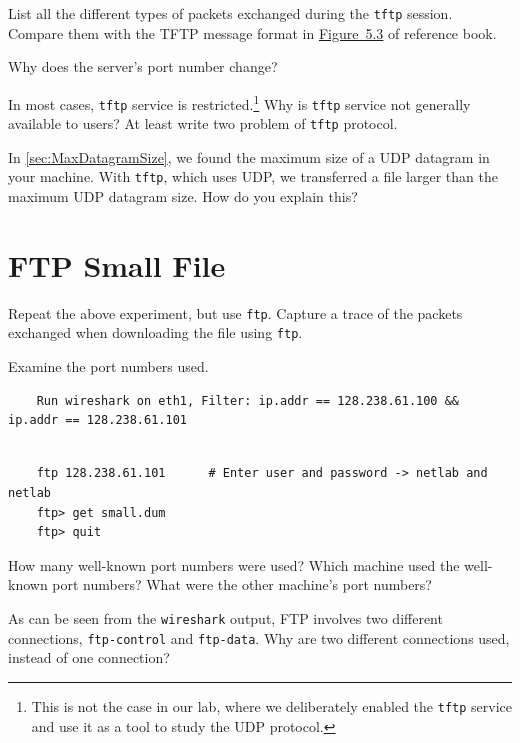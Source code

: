 \documentclass{UTNetLab}
\begin{document}
    \begin{report}
        \item List all the different types of packets exchanged during the \lstinline{tftp} session. Compare them with the TFTP message format in \hyperref[fig:5.3]{Figure~5.3} of reference book.

        Why does the server’s port number change?
        
        \item In most cases, \lstinline{tftp} service is restricted.\footnote{This is not the case in our lab, where we deliberately enabled the \lstinline{tftp} service and use it as a tool to study the UDP protocol.}
        Why is \lstinline{tftp} service not generally available to users? At least write two problem of \lstinline{tftp} protocol.
        
        \item In \autoref{sec:MaxDatagramSize}, we found the maximum size of a UDP datagram in your machine. With \lstinline{tftp}, which uses UDP, we transferred a file larger than the maximum UDP datagram size.
        How do you explain this?
    \end{report}

\section{FTP Small File}
    Repeat the above experiment, but use \lstinline{ftp}.
    Capture a trace of the packets exchanged when downloading the  file using \lstinline{ftp}.

    Examine the port numbers used.
    
    \begin{lstlisting}
    Run wireshark on eth1, Filter: ip.addr == 128.238.61.100 && ip.addr == 128.238.61.101
      
    \end{lstlisting}
    
    \begin{lstlisting}
    ftp 128.238.61.101		# Enter user and password -> netlab and netlab
    ftp> get small.dum
    ftp> quit
    \end{lstlisting}
    
    
    \begin{report}
        \item How many well-known port numbers were used?
        Which machine used the well-known port numbers?
        What were the other machine’s port numbers?
        
        \item As can be seen from the \lstinline{wireshark} output, FTP involves two different connections, \texttt{ftp-control} and \texttt{ftp-data}.
        Why are two different connections used, instead of one connection?
    \end{report}
\end{document}
